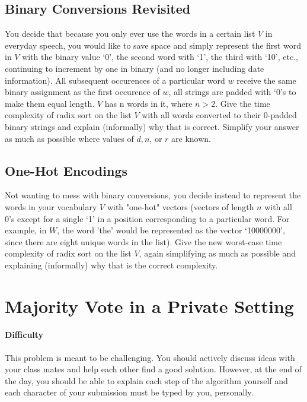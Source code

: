 \documentclass [12pt]{article}
\begin{document}

\subsection{Binary Conversions Revisited }
You decide that because you only ever use the words in a certain list $V$ in everyday speech, you would like to save space and simply represent the first word in $V$ with the binary value `0', the second word with `1', the third with `10', etc., continuing to increment by one in binary (and no longer including date information). All subsequent occurences of a particular word $w$ receive the same binary assignment as the first occurence of $w$, all strings are padded with `0's to make them equal length. $V$ has n words in it, where $n > 2$. Give the time complexity of radix sort on the list $V$ with all words converted to their $0$-padded binary strings and explain (informally) why that is correct. Simplify your answer as much as possible where values of $d, n$, or $r$ are known.

\subsection{One-Hot Encodings} 
Not wanting to mess with binary conversions, you decide instead to represent the words in your vocabulary $V$ with "one-hot" vectors (vectors of length $n$ with all 0's except for a single `1' in a position corresponding to a particular word. For example, in $W$, the word ’the’ would be represented as the vector `10000000', since there are eight unique words in the list). Give the new worst-case time complexity of radix sort on the list $V$, again simplifying as much as possible and explaining (informally) why that is the correct complexity.



\pagebreak
\section{Majority Vote in a Private Setting } 
\begin {Instruction} 

\paragraph{Difficulty} This problem is meant to be challenging. You should actively discuss ideas with your class mates and help each other find a good solution. However, at the end of the day, you should be able to explain each step of the algorithm yourself and each character of your submission must be typed by you, personally.
\end {Instruction} 
\end{document}
